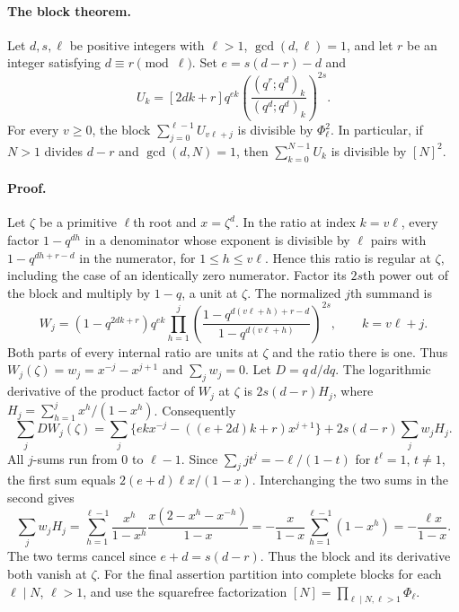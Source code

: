\documentclass[11pt,a4paper]{article}
\numberwithin{equation}{section}
\begin{document}
\paragraph{The block theorem.}
Let $d,s,\ell$ be positive integers with $\ell>1$, $\gcd(d,\ell)=1$,
and let $r$ be an integer satisfying $d\equiv r\pmod\ell$. Set
$e=s(d-r)-d$ and
\[
 U_k=[2dk+r]q^{ek}\left(\frac{(q^r;q^d)_k}{(q^d;q^d)_k}\right)^{2s}.
\]
For every $v\ge0$, the block $\sum_{j=0}^{\ell-1}U_{v\ell+j}$ is divisible
by $\Phi_\ell^2$. In particular, if $N>1$ divides $d-r$ and $\gcd(d,N)=1$,
then $\sum_{k=0}^{N-1}U_k$ is divisible by $[N]^2$.

\paragraph{Proof.}
Let $\zeta$ be a primitive $\ell$th root and $x=\zeta^d$. In the ratio at
index $k=v\ell$, every factor $1-q^{dh}$ in a denominator whose exponent
is divisible by $\ell$ pairs with $1-q^{dh+r-d}$ in the numerator, for
$1\le h\le v\ell$. Hence this ratio is regular at $\zeta$, including the
case of an identically zero numerator. Factor its $2s$th power out of the
block and multiply by $1-q$, a unit at $\zeta$. The normalized $j$th
summand is
\[
 W_j=(1-q^{2dk+r})q^{ek}
 \prod_{h=1}^j\left(\frac{1-q^{d(v\ell+h)+r-d}}
                              {1-q^{d(v\ell+h)}}\right)^{2s},
 \qquad k=v\ell+j .
\]
Both parts of every internal ratio are units at $\zeta$ and the ratio there
is one. Thus $W_j(\zeta)=w_j=x^{-j}-x^{j+1}$ and $\sum_jw_j=0$.
Let $D=q\,d/dq$. The logarithmic derivative of the product factor of
$W_j$ at $\zeta$ is $2s(d-r)H_j$, where
$H_j=\sum_{h=1}^j x^h/(1-x^h)$. Consequently
\[
 \sum_j DW_j(\zeta)=\sum_j\{e k x^{-j}-((e+2d)k+r)x^{j+1}\}
                    +2s(d-r)\sum_j w_jH_j.
\]
All $j$-sums run from $0$ to $\ell-1$. Since $\sum_j jt^j=-\ell/(1-t)$
for $t^\ell=1$, $t\ne1$, the first sum equals
$2(e+d)\ell x/(1-x)$. Interchanging the two sums in the second gives
\[
 \sum_j w_jH_j=
 \sum_{h=1}^{\ell-1}\frac{x^h}{1-x^h}\frac{x(2-x^h-x^{-h})}{1-x}
 =-\frac{x}{1-x}\sum_{h=1}^{\ell-1}(1-x^h)=-\frac{\ell x}{1-x}.
\]
The two terms cancel since $e+d=s(d-r)$. Thus the block and its derivative
both vanish at $\zeta$. For the final assertion partition into complete
blocks for each $\ell\mid N$, $\ell>1$, and use the squarefree factorization
$[N]=\prod_{\ell\mid N,\ell>1}\Phi_\ell$.
\end{document}
